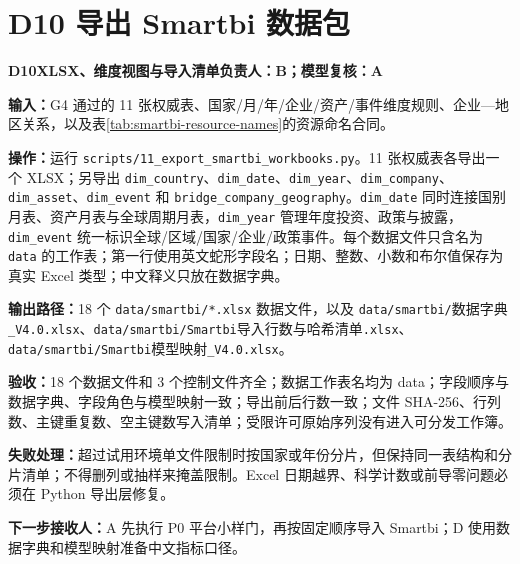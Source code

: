 \documentclass[UTF8,fontset=windows,12pt,openany]{ctexbook}
\newcommand{\Field}[1]{{\small\nolinkurl{#1}}}
\newcommand{\File}[1]{{\small\nolinkurl{#1}}}
\newcommand{\StepTitle}[3]{%
  \noindent\colorbox{DeepNavy}{\parbox{0.965\textwidth}{\color{white}\Large\bfseries #1\quad #2\hfill\normalsize #3}}\par\medskip
}
\newcommand{\CardRow}[2]{\noindent\textbf{#1：}#2\par}
\begin{document}
\section{D10 导出 Smartbi 数据包}
\StepTitle{D10}{XLSX、维度视图与导入清单}{负责人：B；模型复核：A}
\CardRow{输入}{G4 通过的 11 张权威表、国家/月/年/企业/资产/事件维度规则、企业—地区关系，以及表\ref{tab:smartbi-resource-names}的资源命名合同。}
\CardRow{操作}{运行 \File{scripts/11_export_smartbi_workbooks.py}。11 张权威表各导出一个 XLSX；另导出 \Field{dim_country}、\Field{dim_date}、\Field{dim_year}、\Field{dim_company}、\Field{dim_asset}、\Field{dim_event} 和 \Field{bridge_company_geography}。\Field{dim_date} 同时连接国别月表、资产月表与全球周期月表，\Field{dim_year} 管理年度投资、政策与披露，\Field{dim_event} 统一标识全球/区域/国家/企业/政策事件。每个数据文件只含名为 \Field{data} 的工作表；第一行使用英文蛇形字段名；日期、整数、小数和布尔值保存为真实 Excel 类型；中文释义只放在数据字典。}
\CardRow{输出路径}{18 个 \File{data/smartbi/*.xlsx} 数据文件，以及 \File{data/smartbi/}\textsf{数据字典}\File{_V4.0.xlsx}、\File{data/smartbi/Smartbi}\textsf{导入行数与哈希清单}\File{.xlsx}、\File{data/smartbi/Smartbi}\textsf{模型映射}\File{_V4.0.xlsx}。}
\CardRow{验收}{18 个数据文件和 3 个控制文件齐全；数据工作表名均为 data；字段顺序与数据字典、字段角色与模型映射一致；导出前后行数一致；文件 SHA-256、行列数、主键重复数、空主键数写入清单；受限许可原始序列没有进入可分发工作簿。}
\CardRow{失败处理}{超过试用环境单文件限制时按国家或年份分片，但保持同一表结构和分片清单；不得删列或抽样来掩盖限制。Excel 日期越界、科学计数或前导零问题必须在 Python 导出层修复。}
\CardRow{下一步接收人}{A 先执行 P0 平台小样门，再按固定顺序导入 Smartbi；D 使用数据字典和模型映射准备中文指标口径。}
\end{document}
